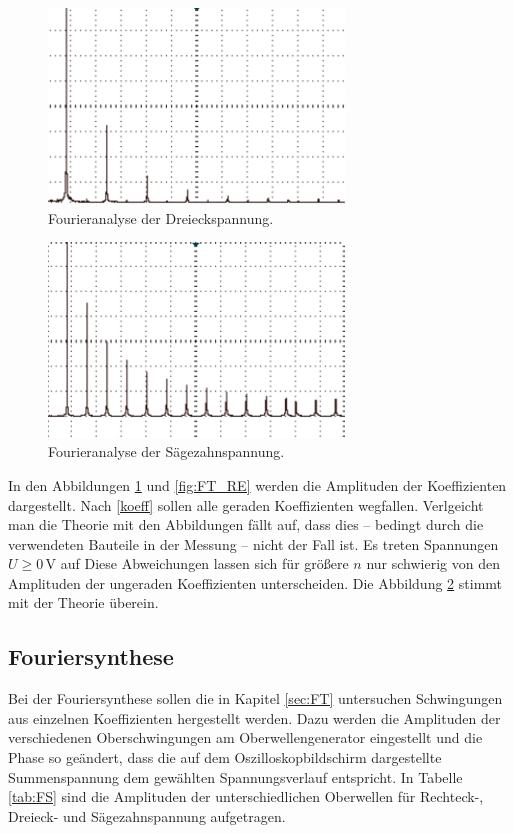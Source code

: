 \begin{figure}
	\centering
		\includegraphics[width=0.7\textwidth]{Bilder/FT_DE2.pdf}		
\caption{Fourieranalyse der Dreieckspannung.}
	\label{fig:FT_DE}
\end{figure}


\begin{figure}
	\centering
		\includegraphics[width=0.7\textwidth]{Bilder/FT_SZ.pdf}		
\caption{Fourieranalyse der Sägezahnspannung.}
	\label{fig:FT_SZ}
\end{figure}

In den Abbildungen \ref{fig:FT_DE} und \ref{fig:FT_RE} werden die Amplituden der Koeffizienten dargestellt. Nach \eqref{koeff} sollen alle geraden Koeffizienten wegfallen. Verlgeicht man die Theorie mit den Abbildungen fällt auf, dass dies -- bedingt durch die verwendeten Bauteile in der Messung -- nicht der Fall ist. Es treten Spannungen $U\geqslant0\,\si\volt$ auf Diese Abweichungen lassen sich für größere $n$ nur schwierig von den Amplituden der ungeraden Koeffizienten unterscheiden.
Die Abbildung \ref{fig:FT_SZ} stimmt mit der Theorie überein.








\subsection{Fouriersynthese}
Bei der Fouriersynthese sollen die in Kapitel \ref{sec:FT} untersuchen Schwingungen aus einzelnen Koeffizienten hergestellt werden. Dazu werden die Amplituden der verschiedenen Oberschwingungen am Oberwellengenerator eingestellt und die Phase so geändert, dass die auf dem Oszilloskopbildschirm dargestellte Summenspannung dem gewählten Spannungsverlauf entspricht. In Tabelle \ref{tab:FS} sind die Amplituden der unterschiedlichen Oberwellen für Rechteck-, Dreieck- und Sägezahnspannung aufgetragen.

